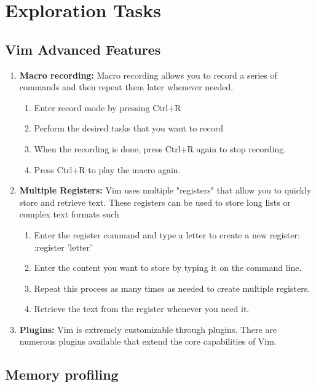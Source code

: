 \documentclass[titlepage]{article}
\begin{document}
\section{Exploration Tasks}
\subsection{Vim Advanced Features}
\begin{enumerate}
    \item \textbf{Macro recording:} Macro recording allows you to record a series of commands and then repeat them later whenever needed.
        \begin{enumerate}
            \item Enter record mode by pressing Ctrl+R
            \item Perform the desired tasks that you want to record
            \item When the recording is done, press Ctrl+R again to stop recording.
            \item Press Ctrl+R to play the macro again.
        \end{enumerate}

    \item \textbf{Multiple Registers:} Vim uses multiple "registers" that allow you to quickly store and retrieve text. These registers can be used to store long lists or complex text formats such 
        \begin{enumerate}
            \item Enter the register command and type a letter to create a new register:\\
            :register 'letter'
            \item Enter the content you want to store by typing it on the command line.
            \item Repeat this process as many times as needed to create multiple registers.
            \item Retrieve the text from the register whenever you need it.
        \end{enumerate}

    \item \textbf{Plugins:} Vim is extremely customizable through plugins. There are numerous plugins available that extend the core capabilities of Vim.
\end{enumerate}

\subsection{Memory profiling}
\end{document}
